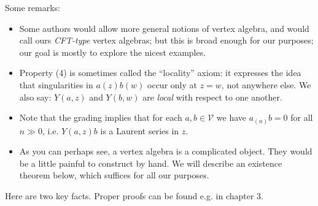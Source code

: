 \documentclass[12pt,letterpaper,reqno]{amsart}
\numberwithin{equation}{section}
\newcommand{\vertex}{\mathcal{V}}
\newcommand{\ti}[1]{\textit{#1}}
\begin{document}
Some remarks:
\begin{itemize}
\item Some authors would allow more general notions of
vertex algebra, and would call ours \ti{CFT-type} vertex algebras;
but this is broad enough for our purposes;
our goal is mostly to explore the nicest examples.

\item Property (4) is sometimes called the ``locality'' axiom: it 
expresses the idea that singularities in $a(z) b(w)$ occur only
at $z=w$, not anywhere else. We also say: $Y(a,z)$ and $Y(b,w)$ are \ti{local} with respect to one another.

\item Note that the grading implies that for each \(a, b \in \vertex \) we have \(a_{(n)}b=0\) for all \(n\gg 0\), i.e. 
$Y(a,z) b$ is a Laurent series in $z$.



\item As you can perhaps see, a vertex algebra is a complicated object.
They would be a little painful to construct by hand. We will describe an
existence theorem below, which suffices for all our purposes.
\end{itemize}



Here are two key facts. Proper proofs can be found e.g.
in \cite{FrenkelBenZvi2004VertexAlgebrasCurves} chapter 3.
\end{document}
